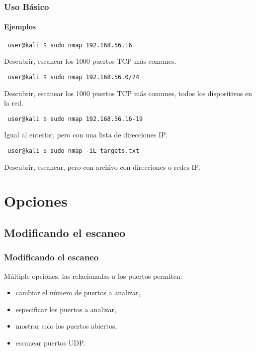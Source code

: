 \documentclass[aspectratio=169]{beamer}
\begin{document}
\begin{frame}[fragile]

    \frametitle{Uso B\'asico}

    \framesubtitle{Ejemplos}

    \begin{lstlisting}
 user@kali $ sudo nmap 192.168.56.16
    \end{lstlisting}

    Descubrir, escanear los 1000 puertos TCP m\'as comunes.

    \pause

    \begin{lstlisting}
 user@kali $ sudo nmap 192.168.56.0/24
    \end{lstlisting}

    Descubrir, escanear los 1000 puertos TCP m\'as comunes, todos los dispositivos en la red.

    \pause

    \begin{lstlisting}
 user@kali $ sudo nmap 192.168.56.16-19
    \end{lstlisting}

    Igual al enterior, pero con una lista de direcciones IP.

    \pause

    \begin{lstlisting}
 user@kali $ sudo nmap -iL targets.txt
    \end{lstlisting}

    Descubrir, escanear, pero con archivo con direcciones o redes IP.

\end{frame}

\section{Opciones}

\subsection{Modificando el escaneo}

\begin{frame}
    \frametitle{Modificando el escaneo}

    M\'ultiple opciones, las relacionadas a los puertos permiten:

    \begin{itemize}
        \item cambiar el n\'umero de puertos a analizar,
        \item especificar los puertos a analizar,
        \item mostrar solo los puertos abiertos,
        \item escanear puertos UDP.
    \end{itemize}

\end{frame}
\end{document}
